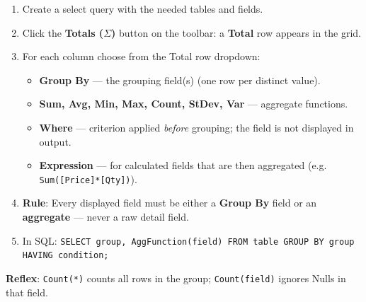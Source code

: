\documentclass[11pt]{article}
\newcommand{\legende}[1]{\par\vspace{6pt}{\popsemi\fontsize{9}{11.5}\selectfont\color{popmuted}#1}}
\begin{document}
\begin{methode}
\begin{enumerate}
\item Create a select query with the needed tables and fields.
\item Click the \textbf{Totals ($\Sigma$)} button on the toolbar: a \textbf{Total} row appears in the grid.
\item For each column choose from the Total row dropdown:
\begin{itemize}
\item \textbf{Group By} --- the grouping field(s) (one row per distinct value).
\item \textbf{Sum, Avg, Min, Max, Count, StDev, Var} --- aggregate functions.
\item \textbf{Where} --- criterion applied \emph{before} grouping; the field is not displayed in output.
\item \textbf{Expression} --- for calculated fields that are then aggregated (e.g. \texttt{Sum([Price]*[Qty])}).
\end{itemize}
\item \textbf{Rule}: Every displayed field must be either a \textbf{Group By} field or an \textbf{aggregate} --- never a raw detail field.
\item In SQL: \texttt{SELECT group, AggFunction(field) FROM table GROUP BY group HAVING condition;}
\end{enumerate}
\textbf{Reflex}: \texttt{Count(*)} counts all rows in the group; \texttt{Count(field)} ignores Nulls in that field.
\end{methode}

\begin{popfigure}
\centering
{}
\legende{Totals row with Group By, Count, Sum, Avg}
\end{popfigure}
\end{document}
